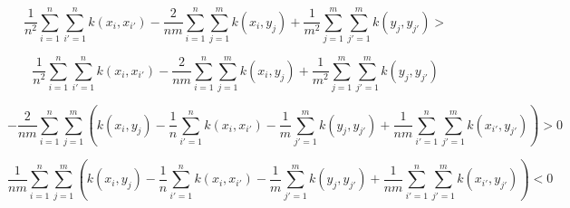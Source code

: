 \begin{small} 
\begin{equation*}
\frac{1}{n^2}\sum_{i=1}^{n}\sum_{i'=1}^{n}k(x_i, x_{i'}) - \frac{2}{nm}\sum_{i=1}^{n}\sum_{j=1}^{m}k(x_i, y_j) + \frac{1}{m^2}\sum_{j=1}^{m}\sum_{j'=1}^{m}k(y_j, y_{j'}) > 
\end{equation*} 
\end{small} 
\begin{small} 
\begin{equation*}
\frac{1}{n^2}\sum_{i=1}^{n}\sum_{i'=1}^{n}k(x_i, x_{i'}) - \frac{2}{nm}\sum_{i=1}^{n}\sum_{j=1}^{m}k(x_i, y_j) + \frac{1}{m^2}\sum_{j=1}^{m}\sum_{j'=1}^{m}k(y_j, y_{j'})  
\end{equation*}
\end{small} 

\begin{small} 
\begin{equation*}
-\frac{2}{nm}\sum_{i=1}^{n}\sum_{j=1}^{m}\left(k(x_i, y_j) - \frac{1}{n}\sum_{i'=1}^{n}k(x_i, x_{i'}) - \frac{1}{m}\sum_{j'=1}^{m}k(y_j, y_{j'}) + \frac{1}{nm}\sum_{i'=1}^{n}\sum_{j'=1}^{m}k(x_{i'}, y_{j'})\right) > 0 
\end{equation*} 
\end{small} 

\begin{small} 
\begin{equation*}
\frac{1}{nm}\sum_{i=1}^{n}\sum_{j=1}^{m}\left(k(x_i, y_j) - \frac{1}{n}\sum_{i'=1}^{n}k(x_i, x_{i'}) - \frac{1}{m}\sum_{j'=1}^{m}k(y_j, y_{j'}) + \frac{1}{nm}\sum_{i'=1}^{n}\sum_{j'=1}^{m}k(x_{i'}, y_{j'})\right) < 0 
\end{equation*} 
\end{small}
\fi